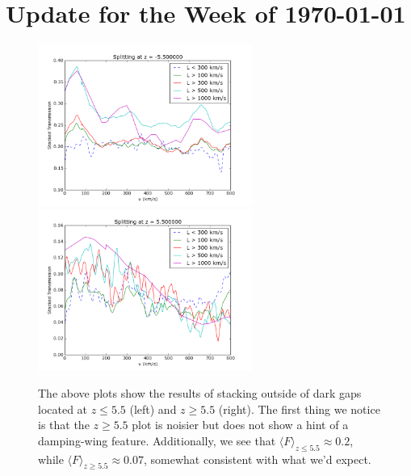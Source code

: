 \documentclass[11pt]{article}
\begin{document}
\section*{Update for the Week of \today}

\begin{figure}[h]
  \centering
  \includegraphics[width=7cm]{Stack_Zlessthan5p5.png}
  \includegraphics[width=7cm]{Stack_Zgreaterthan5p5.png}
  \caption{The above plots show the results of stacking outside of dark gaps located at $z \leq 5.5$ (left) and $z \geq 5.5$ (right). The first thing we notice is that the $z \geq 5.5$ plot is noisier but does not show a hint of a damping-wing feature. Additionally, we see that $\langle F \rangle_{z\leq 5.5} \approx 0.2$, while $\langle F \rangle_{z\geq 5.5} \approx 0.07$, somewhat consistent with what we'd expect.}
  \label{fig:z5p5}
\end{figure}
\end{document}
